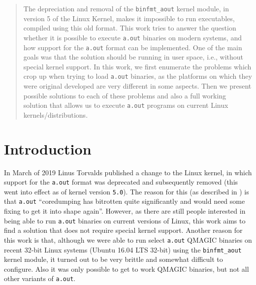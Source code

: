\documentclass[draft,final]{vutinfth} %
\begin{document}
\begin{abstract}
The depreciation and removal of the \texttt{binfmt\_aout} kernel module, in version 5 of the Linux Kernel, makes it impossible to run executables, compiled using this old format. This work tries to answer the question whether it is possible to execute \texttt{a.out} binaries on modern systems, and how support for the \texttt{a.out} format can be implemented. One of the main goals was that the solution should be running in user space, i.e., without special kernel support. In this work, we first enumerate the problems which crop up when trying to load \texttt{a.out} binaries, as the platforms on which they were original developed are very different in some aspects. Then we present possible solutions to each of these problems and also a full working solution that allows us to execute \texttt{a.out} programs on current Linux kernels/distributions.
\end{abstract}


\tableofcontents %

\mainmatter

\chapter{Introduction}
\label{intro}

In March of 2019 Linus Torvalds published a change \cite{PhoronixNews} \cite{LinuxKernelGitMsg} to the Linux kernel, in which support for the \texttt{a.out} format was deprecated and subsequently removed (this went into effect as of kernel version \texttt{5.0}). The reason for this (as described in \cite{LinuxMailingList}) is that \texttt{a.out} ``coredumping has bitrotten quite significantly and would need some fixing to get it into shape again''. However, as there are still people interested in being able to run \texttt{a.out} binaries on current versions of Linux, this work aims to find a solution that does not require special kernel support. Another reason for this work is that, although we were able to run select \texttt{a.out} QMAGIC binaries on recent 32-bit Linux systems (Ubuntu 16.04 LTS 32-bit) using the \texttt{binfmt\_aout} kernel module, it turned out to be very brittle and somewhat difficult to configure. Also it was only possible to get to work QMAGIC binaries, but not all other variants of \texttt{a.out}.
\end{document}
